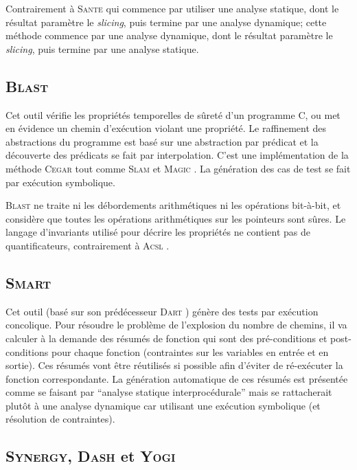 \documentclass[french]{spimufcphdthesis}
\begin{document}
Contrairement à \textsc{Sante} \cite{SANTE} qui commence par utiliser une
analyse statique, dont le résultat paramètre le {\em slicing}, puis termine par
une analyse dynamique; cette méthode commence par une analyse dynamique, dont
le résultat paramètre le {\em slicing}, puis termine par une analyse statique.

\subsection{\textsc{Blast}}

Cet outil \cite{BLAST} vérifie les propriétés temporelles de sûreté d'un
programme C, ou met en évidence un chemin d'exécution violant une propriété. Le
raffinement des abstractions du programme est basé sur une abstraction par
prédicat et la découverte des prédicats se fait par interpolation. C'est une
implémentation de la méthode \textsc{Cegar} \cite{CEGAR} tout comme
\textsc{Slam} \cite{SLAM} et \textsc{Magic} \cite{MAGIC}. La génération des cas
de test se fait par exécution symbolique.

\textsc{Blast} ne traite ni les débordements arithmétiques ni les opérations
bit-à-bit, et considère que toutes les opérations arithmétiques sur les
pointeurs sont sûres. Le langage d'invariants utilisé pour décrire les
propriétés ne contient pas de quantificateurs, contrairement à \textsc{Acsl}
\cite{ACSL}.

\subsection{\textsc{Smart}}

Cet outil \cite{SMART} (basé sur son prédécesseur \textsc{Dart} \cite{DART})
génère des tests par exécution concolique. Pour résoudre le problème de
l'explosion du nombre de chemins, il va calculer à la demande des résumés de
fonction qui sont des pré-conditions et post-conditions pour chaque fonction
(contraintes sur les variables en entrée et en sortie). Ces résumés vont être
réutilisés si possible afin d'éviter de ré-exécuter la fonction correspondante.
La génération automatique de ces résumés est présentée comme se faisant par
``analyse statique interprocédurale'' mais se rattacherait plutôt à une analyse
dynamique car utilisant une exécution symbolique (et résolution de contraintes).

\subsection{\textsc{Synergy}, \textsc{Dash} et \textsc{Yogi}}
\end{document}
